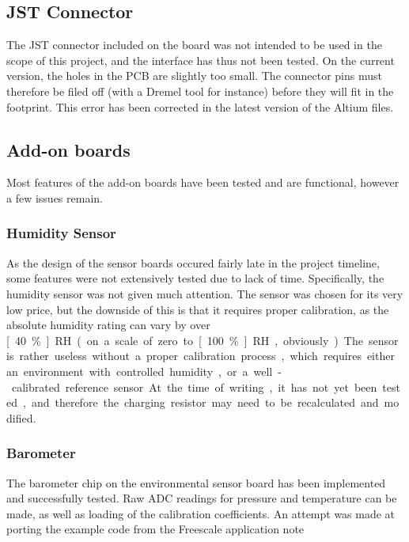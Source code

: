 \subsection{JST Connector}
The JST connector included on the board was not intended to be used in the scope
of this project, and the interface has thus not been tested. On the current
version, the holes in the PCB are slightly too small. The connector pins must
therefore be filed off (with a Dremel tool for instance) before they will fit in
the footprint. This error has been corrected in the latest version of the Altium
files. %

\subsection{Add-on boards}
Most features of the add-on boards have been tested and are functional, however
a few issues remain.

\subsubsection{Humidity Sensor}
\label{sub2:humidity}
As the design of the sensor boards occured fairly late in the project timeline,
some features were not extensively tested due to lack of time. Specifically, the
humidity sensor was not given much attention. The sensor was chosen for its very
low price, but the downside of this is that it requires proper calibration, as
the absolute humidity rating can vary by over \unit[40\%]{RH} (on a scale of
zero to \unit[100\%]{RH}, obviously). The sensor is rather useless without a
proper calibration process, which requires either an environment with controlled
humidity, or a well-calibrated reference sensor. At the time of writing, it has
not yet been tested, and therefore the charging resistor may need to be
recalculated and modified.

\subsubsection{Barometer}
\label{sub2:barometer}
The barometer chip on the environmental sensor board has been implemented and
successfully tested. Raw ADC readings for pressure and temperature can be made,
as well as loading of the calibration coefficients. An attempt was made
at porting the example code from the Freescale application
note\cite{freescale3785}


